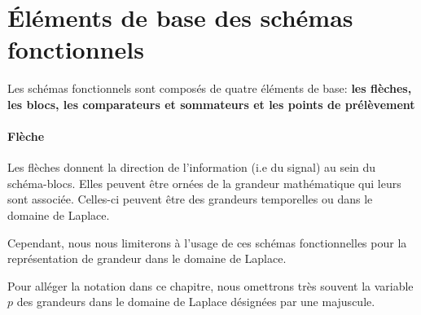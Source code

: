 \section{\'Eléments de base des schémas fonctionnels}
Les schémas fonctionnels sont composés de quatre éléments de base:
\textbf{les flèches, les blocs, les comparateurs et sommateurs et les points 
de prélèvement}
\paragraph{Flèche}
Les flèches donnent la direction de l'information (i.e du signal) au sein du 
schéma-blocs. Elles peuvent être ornées de la grandeur mathématique qui leurs 
sont associée. 
Celles-ci peuvent être des grandeurs temporelles ou dans le domaine de Laplace. 
\begin{center}

\end{center}
Cependant, nous nous limiterons à l'usage de ces schémas fonctionnelles pour la 
représentation de grandeur dans le domaine de Laplace.

Pour alléger la notation dans ce chapitre, nous omettrons 
très souvent la variable $p$ des grandeurs dans le domaine de Laplace désignées 
par une majuscule.
